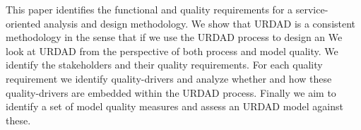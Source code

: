 This paper identifies the functional and quality requirements for a service-oriented analysis and design methodology. We show that URDAD is a consistent methodology in the sense that if we use the URDAD process to design an 
We look at URDAD from the perspective of both process and model quality. We identify the stakeholders and their quality requirements. For each quality requirement we identify quality-drivers and analyze whether and how these quality-drivers are embedded within the URDAD process. Finally we aim to identify a set of model quality measures and assess an URDAD model against these.
